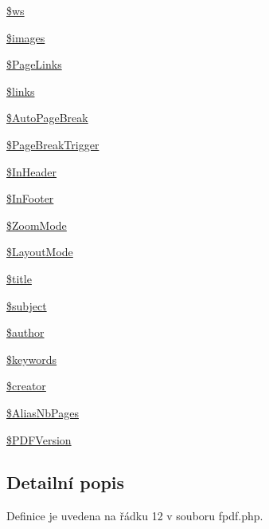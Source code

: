 \begin{DoxyCompactItemize}
\item 
\hyperlink{class_f_p_d_f_a05ee8f35c8f7e1d15680d28bb40eddf6}{\$ws}
\item 
\hyperlink{class_f_p_d_f_afc8b2e219390a60499ed3d6a28b31f2d}{\$images}
\item 
\hyperlink{class_f_p_d_f_a3e93616a74e983712775cb72a00fed38}{\$\-Page\-Links}
\item 
\hyperlink{class_f_p_d_f_ad75c5e32c5417504ba4d351e0383869f}{\$links}
\item 
\hyperlink{class_f_p_d_f_ad196be21405b44433e08efedf63fcf27}{\$\-Auto\-Page\-Break}
\item 
\hyperlink{class_f_p_d_f_a1a0fd03d8f95b0119fed813fe5c980a8}{\$\-Page\-Break\-Trigger}
\item 
\hyperlink{class_f_p_d_f_ad826d8f87302ffc1b53c3af9b32509e2}{\$\-In\-Header}
\item 
\hyperlink{class_f_p_d_f_a9550396e618abf65f024fb07b4c31bdd}{\$\-In\-Footer}
\item 
\hyperlink{class_f_p_d_f_afc97ebf2f645908e261c641fbf48be92}{\$\-Zoom\-Mode}
\item 
\hyperlink{class_f_p_d_f_a8a1b8f011e83924e04fd4868e6a0fd25}{\$\-Layout\-Mode}
\item 
\hyperlink{class_f_p_d_f_a1a9653841a04eab8f7792dc620ad768f}{\$title}
\item 
\hyperlink{class_f_p_d_f_a01809a20cac7b1b9123141262ac881e2}{\$subject}
\item 
\hyperlink{class_f_p_d_f_a0fd364189356e647c1e12ff1d264b292}{\$author}
\item 
\hyperlink{class_f_p_d_f_af911783b120fbaaebdad50473826a43a}{\$keywords}
\item 
\hyperlink{class_f_p_d_f_a8e24c7db53f08092a8038d7aa7d07a48}{\$creator}
\item 
\hyperlink{class_f_p_d_f_a8ca11347db37499aaf473e390db7459b}{\$\-Alias\-Nb\-Pages}
\item 
\hyperlink{class_f_p_d_f_a5d794ad25d8bbf69f42452deb7e1a2be}{\$\-P\-D\-F\-Version}
\end{DoxyCompactItemize}


\subsection{Detailní popis}


Definice je uvedena na řádku 12 v souboru fpdf.\-php.



